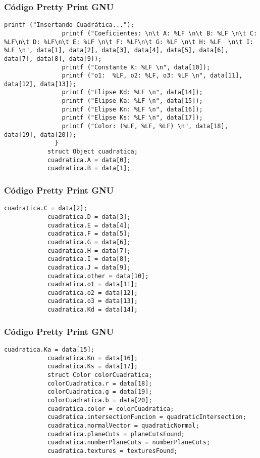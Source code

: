 \documentclass{beamer}
\begin{document}
\begin{frame}[fragile]
\frametitle{C\'odigo Pretty Print GNU}
\begin{lstlisting}[style=CStyle]
                printf ("Insertando Cuadrática...");
                printf ("Coeficientes: \n\t A: %LF \n\t B: %LF \n\t C: %LF\n\t D: %LF\n\t E: %LF \n\t F: %LF\n\t G: %LF \n\t H: %LF  \n\t I: %LF \n", data[1], data[2], data[3], data[4], data[5], data[6], data[7], data[8], data[9]);
                printf ("Constante K: %LF \n", data[10]);
                printf ("o1:  %LF, o2: %LF, o3: %LF \n", data[11], data[12], data[13]);
                printf ("Elipse Kd: %LF \n", data[14]);
                printf ("Elipse Ka: %LF \n", data[15]);
                printf ("Elipse Kn: %LF \n", data[16]);
                printf ("Elipse Ks: %LF \n", data[17]);
                printf ("Color: (%LF, %LF, %LF) \n", data[18], data[19], data[20]);
              }
            struct Object cuadratica;
            cuadratica.A = data[0];
            cuadratica.B = data[1];
\end{lstlisting}
\end{frame}
\begin{frame}[fragile]
\frametitle{C\'odigo Pretty Print GNU}
\begin{lstlisting}[style=CStyle]
            cuadratica.C = data[2];
            cuadratica.D = data[3];
            cuadratica.E = data[4];
            cuadratica.F = data[5];
            cuadratica.G = data[6];
            cuadratica.H = data[7];
            cuadratica.I = data[8];
            cuadratica.J = data[9];
            cuadratica.other = data[10];
            cuadratica.o1 = data[11];
            cuadratica.o2 = data[12];
            cuadratica.o3 = data[13];
            cuadratica.Kd = data[14];
\end{lstlisting}
\end{frame}
\begin{frame}[fragile]
\frametitle{C\'odigo Pretty Print GNU}
\begin{lstlisting}[style=CStyle]
            cuadratica.Ka = data[15];
            cuadratica.Kn = data[16];
            cuadratica.Ks = data[17];
            struct Color colorCuadratica;
            colorCuadratica.r = data[18];
            colorCuadratica.g = data[19];
            colorCuadratica.b = data[20];
            cuadratica.color = colorCuadratica;
            cuadratica.intersectionFuncion = quadraticIntersection;
            cuadratica.normalVector = quadraticNormal;
            cuadratica.planeCuts = planeCutsFound;
            cuadratica.numberPlaneCuts = numberPlaneCuts;
            cuadratica.textures = texturesFound;
\end{lstlisting}
\end{frame}
\end{document}
